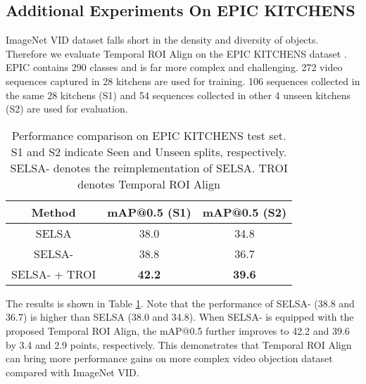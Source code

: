 \documentclass[letterpaper]{article} \usepackage{aaai21}  \usepackage{times}  \usepackage{helvet} \usepackage{courier}  \usepackage[hyphens]{url}  \usepackage{graphicx} \usepackage{hyperref}
\begin{document}
\subsection{Additional Experiments On EPIC KITCHENS}
ImageNet VID dataset falls short in the density and diversity of objects. Therefore we evaluate Temporal ROI Align on the EPIC KITCHENS dataset \cite{damen2018scaling}. EPIC contains 290 classes and is far more complex and challenging. 272 video sequences captured in 28 kitchens are used for training. 106 sequences collected in the same 28 kitchens (S1) and 54 sequences collected in other 4 unseen kitchens (S2) are used for evaluation. \begin{table}[t]
\begin{center}
\small
\begin{tabular}{c|c|c}
  \hline
  \hline
  Method & mAP@0.5 (S1) & mAP@0.5 (S2)\\
  \hline
  \hline
  SELSA \cite{wu2019sequence} & 38.0 & 34.8\\
  \hline
  SELSA- & 38.8 & 36.7\\
  SELSA- + TROI & \textbf{42.2} & \textbf{39.6}\\
  \hline
  \hline
\end{tabular}
\end{center}
\vspace{-0.2cm}
\caption{Performance comparison on EPIC KITCHENS test set. S1 and S2 indicate Seen and Unseen splits, respectively. SELSA- denotes the reimplementation of SELSA. TROI denotes Temporal ROI Align}
\label{t:epic}
\end{table}

The results is shown in Table \ref{t:epic}. Note that the performance of SELSA- (38.8 and 36.7) is higher than SELSA \cite{wu2019sequence} (38.0 and 34.8). When SELSA- is equipped with the proposed Temporal ROI Align, the mAP@0.5 further improves to 42.2 and 39.6 by 3.4 and 2.9 points, respectively. This demonstrates that Temporal ROI Align can bring more performance gains on more complex video objection dataset compared with ImageNet VID.
\end{document}
